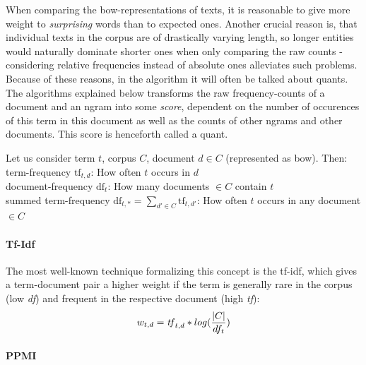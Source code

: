When comparing the \gls{bow}-representations of texts, it is reasonable to give more weight to \emph{surprising} words than to expected ones.  \cite[156]{Turney2010} Another crucial reason is, that individual texts in the corpus are of drastically varying length, so longer entities would naturally dominate shorter ones when only comparing the raw counts - considering relative frequencies instead of absolute ones alleviates such problems. Because of these reasons, in the algorithm it will often be talked about \glspl{quant}. The algorithms explained below transforms the raw frequency-counts of a document and an \gls{ngram} into some \emph{score}, dependent on the number of occurences of this term in this document as well as the counts of other \glspl{ngram} and other documents. This score is henceforth called a \gls{quant}.

Let us consider term $t$, corpus $C$, document $d \in C$ (represented as \gls{bow}). Then:\\
term-frequency $\text{tf}_{t,d}$: How often $t$ occurs in $d$\\
document-frequency $\text{df}_t$: How many documents $\in C$ contain $t$\\
summed term-frequency $\text{df}_{t,*} = \sum_{d' \in C} \text{tf}_{t,d'}$: How often $t$ occurs in any document $\in C$

\paragraph{Tf-Idf} The most well-known technique formalizing this concept is the \gls{tf-idf}, which gives a term-document pair a higher weight if the term is generally rare in the corpus (low \textit{df}) and frequent in the respective document (high \textit{tf}):
\vspace{-3ex}
$$ w_{t,d} = \text{\textit{tf}}_{t,d} * log(\frac{|C|}{df_t}) $$


\paragraph{PPMI}

